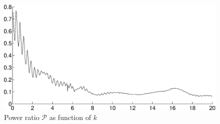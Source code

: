 \documentclass[numreferences]{kluwer}
\renewcommand{\Phi}{\varPhi}
\renewcommand{\Re}{\operatorname{Re}}
\renewcommand{\vec}[1]{\bm{#1}}
\renewcommand{\Phi}{\varPhi}
\newcommand{\Phiin}{\vec\Phi^{\text{in}}}
\begin{document}
\begin{figure}[htb]
  \centering
  \includegraphics[width=0.9\linewidth]{ekvot}
  \caption{Power ratio $\mathcal P$ as function of $k$}
  \label{fig:ekvot}
\end{figure}



\end{document}
